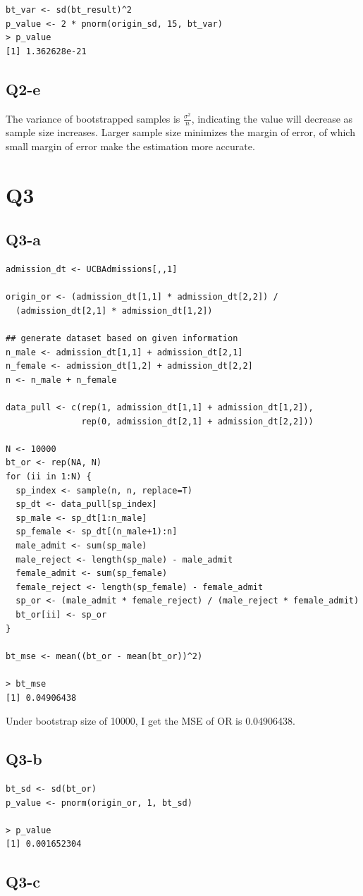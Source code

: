 \documentclass[12pt,letterpaper]{article}
\begin{document}
\begin{verbatim}
bt_var <- sd(bt_result)^2
p_value <- 2 * pnorm(origin_sd, 15, bt_var)
> p_value
[1] 1.362628e-21
\end{verbatim}

\subsection*{Q2-e}
\noindent The variance of bootstrapped samples is $\frac{\sigma^2}{n}$, indicating the value will decrease as sample size increases. Larger sample size
minimizes the margin of error, of which small margin of error make the estimation more accurate. 

\section*{Q3}
\subsection*{Q3-a}
\begin{verbatim}
admission_dt <- UCBAdmissions[,,1]

origin_or <- (admission_dt[1,1] * admission_dt[2,2]) / 
  (admission_dt[2,1] * admission_dt[1,2])

## generate dataset based on given information
n_male <- admission_dt[1,1] + admission_dt[2,1]
n_female <- admission_dt[1,2] + admission_dt[2,2]
n <- n_male + n_female

data_pull <- c(rep(1, admission_dt[1,1] + admission_dt[1,2]), 
               rep(0, admission_dt[2,1] + admission_dt[2,2]))

N <- 10000
bt_or <- rep(NA, N)
for (ii in 1:N) {
  sp_index <- sample(n, n, replace=T)
  sp_dt <- data_pull[sp_index]
  sp_male <- sp_dt[1:n_male]
  sp_female <- sp_dt[(n_male+1):n]
  male_admit <- sum(sp_male)
  male_reject <- length(sp_male) - male_admit
  female_admit <- sum(sp_female)
  female_reject <- length(sp_female) - female_admit
  sp_or <- (male_admit * female_reject) / (male_reject * female_admit)
  bt_or[ii] <- sp_or
}

bt_mse <- mean((bt_or - mean(bt_or))^2)

> bt_mse
[1] 0.04906438
\end{verbatim}

\noindent Under bootstrap size of 10000, I get the MSE of OR is 0.04906438.

\subsection*{Q3-b}
\begin{verbatim}
bt_sd <- sd(bt_or)
p_value <- pnorm(origin_or, 1, bt_sd)

> p_value
[1] 0.001652304
\end{verbatim}

\subsection*{Q3-c}


\end{document}
